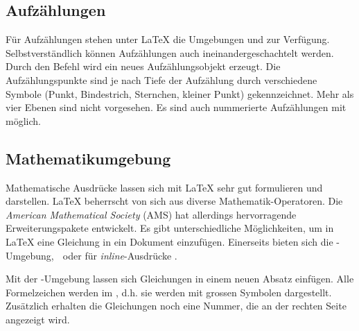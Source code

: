 \subsection{Aufzählungen}
Für Aufzählungen stehen unter \LaTeX{} die Umgebungen  und  zur Verfügung. Selbstverständlich können Aufzählungen auch ineinandergeschachtelt werden.
Durch den Befehl  wird ein neues Aufzählungsobjekt erzeugt. Die Aufzählungspunkte sind je nach Tiefe der Aufzählung durch verschiedene Symbole (Punkt, Bindestrich, Sternchen, kleiner Punkt) gekennzeichnet. Mehr als vier Ebenen sind nicht vorgesehen.
Es sind auch nummerierte Aufzählungen mit  möglich. 
$ $

\subsection{Mathematikumgebung}
Mathematische Ausdrücke lassen sich mit \LaTeX$ $ sehr gut formulieren und darstellen. \LaTeX$ $ beherrscht von sich aus diverse Mathematik-Operatoren. Die \textit{American Mathematical Society} (AMS) hat allerdings hervorragende Erweiterungspakete entwickelt.
Es gibt unterschiedliche Möglichkeiten, um in \LaTeX $ $ eine Gleichung in ein Dokument einzufügen. Einerseits bieten sich die -Umgebung, \befehl{[}$\; $\befehl{]} oder für \textit{inline}-Ausdrücke \umgebung{\$ \$}.\vspace{6pt}

Mit der -Umgebung lassen sich Gleichungen in einem neuen Absatz einfügen. Alle Formelzeichen werden im , d.h. sie werden mit grossen Symbolen dargestellt. Zusätzlich erhalten die Gleichungen noch eine Nummer, die an der rechten Seite angezeigt wird.

